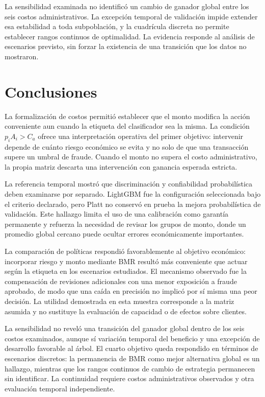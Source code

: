 \documentclass[conference,letterpaper]{IEEEtran}
\newcommand{\Ca}{C_a}
\begin{document}
La sensibilidad examinada no identificó un cambio de ganador global entre los seis costos administrativos. La excepción temporal de validación impide extender esa estabilidad a toda subpoblación, y la cuadrícula discreta no permite establecer rangos continuos de optimalidad. La evidencia responde al análisis de escenarios previsto, sin forzar la existencia de una transición que los datos no mostraron.

\clearpage
\section{Conclusiones}
La formalización de costos permitió establecer que el monto modifica la acción conveniente aun cuando la etiqueta del clasificador sea la misma. La condición $p_iA_i>\Ca$ ofrece una interpretación operativa del primer objetivo: intervenir depende de cuánto riesgo económico se evita y no solo de que una transacción supere un umbral de fraude. Cuando el monto no supera el costo administrativo, la propia matriz descarta una intervención con ganancia esperada estricta.

La referencia temporal mostró que discriminación y confiabilidad probabilística deben examinarse por separado. LightGBM fue la configuración seleccionada bajo el criterio declarado, pero Platt no conservó en prueba la mejora probabilística de validación. Este hallazgo limita el uso de una calibración como garantía permanente y refuerza la necesidad de revisar los grupos de monto, donde un promedio global cercano puede ocultar errores económicamente importantes.

La comparación de políticas respondió favorablemente al objetivo económico: incorporar riesgo y monto mediante BMR resultó más conveniente que actuar según la etiqueta en los escenarios estudiados. El mecanismo observado fue la compensación de revisiones adicionales con una menor exposición a fraude aprobado, de modo que una caída en precisión no implicó por sí misma una peor decisión. La utilidad demostrada en esta muestra corresponde a la matriz asumida y no sustituye la evaluación de capacidad o de efectos sobre clientes.

La sensibilidad no reveló una transición del ganador global dentro de los seis costos examinados, aunque sí variación temporal del beneficio y una excepción de desarrollo favorable al árbol. El cuarto objetivo queda respondido en términos de escenarios discretos: la permanencia de BMR como mejor alternativa global es un hallazgo, mientras que los rangos continuos de cambio de estrategia permanecen sin identificar. La continuidad requiere costos administrativos observados y otra evaluación temporal independiente.
\end{document}
